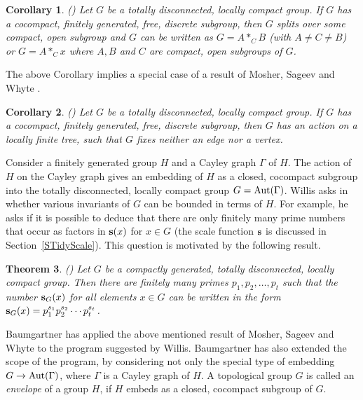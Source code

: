 \documentclass{emsprocart}
\newtheorem{theorem}{Theorem}[section]
\newtheorem{corollary}[theorem]{Corollary}
\theoremstyle{definition}
\begin{document}
\begin{corollary} {\rm (\cite[Corollary~3.29]{KronMoller2008})}
Let $G$ be a totally disconnected,
  locally compact group.  If $G$ has a cocompact, finitely generated,
  free, discrete subgroup, then $G$ splits over some compact, open
  subgroup and $G$ can be written as $G=A*_C B$ (with $A\neq C\neq
B$) or $G=A*_C x$  where
$A, B$ and $C$ are compact, open subgroups of $G$.
\end{corollary}

The above Corollary implies a special case of a result
of Mosher, Sageev and Whyte
\cite[Theorem~9]{MosherSageevWhyte2003}.

\begin{corollary} {\rm (\cite[Corollary~3.30]{KronMoller2008})}
 Let $G$ be a  totally disconnected,
  locally compact group.  If $G$ has a cocompact, finitely generated,
  free, discrete subgroup, then $G$ has an action on a locally finite
  tree, such that $G$ fixes neither an edge nor a vertex.
\end{corollary}

Consider a finitely generated group $H$ and a Cayley graph $\Gamma$ of
$H$.  The action of $H$ on the Cayley graph gives an embedding of $H$
as a closed, cocompact subgroup into the totally disconnected, locally
compact group $G={\mbox{${\rm Aut}(\Gamma)$}}$.
Willis asks in \cite[Section 6]{Willis2004} whether various invariants
of $G$ can be bounded in terms of $H$.  For example, he asks if
it is possible to deduce that there are only finitely many
prime numbers that occur as factors in ${\bf s}(x)$ for $x\in G$
(the scale function ${\bf s}$ is discussed in  Section~\ref{STidyScale}).
This question is motivated by the following result.

\begin{theorem}{\rm (\cite[Theorem 3.4]{Willis2001})}
Let $G$ be a compactly generated, totally disconnected, locally compact
group.  Then there are finitely many primes $p_1, p_2, \ldots, p_t$ such that
the number ${\bf s}_G(x)$ for all elements $x\in G$ can be written in the
form ${\bf s}_G(x)=p_1^{s_1}p_2^{s_2}\cdots  p_t^{s_t}$.
\end{theorem}

Baumgartner \cite{Baumgartner2007} has applied the above mentioned result of
Mosher, Sageev and Whyte to the program suggested by Willis.
Baumgartner has also extended the scope of the program, by
considering not only the special type of embedding $G\rightarrow
{\mbox{${\rm Aut}(\Gamma)$}}$, where $\Gamma$ is a Cayley graph of $H$.
A topological group $G$ is called an {\em envelope} of
a group $H$, if $H$ embeds as a closed, cocompact subgroup of $G$.
\end{document}
